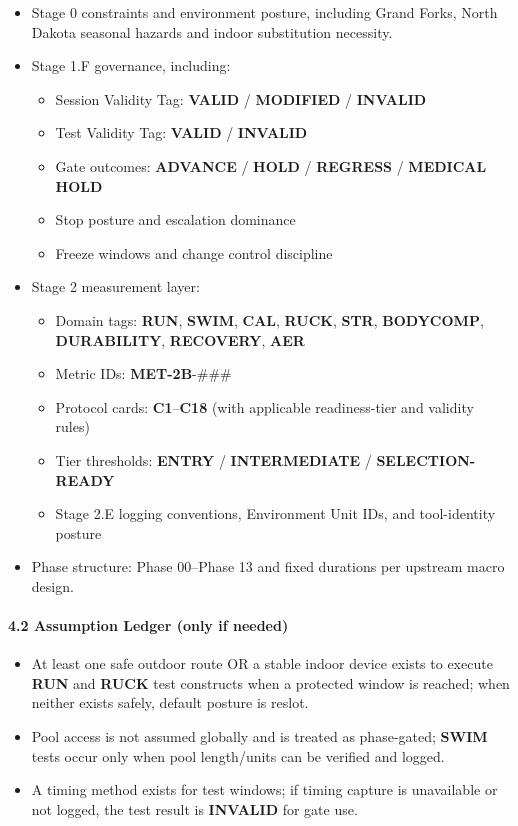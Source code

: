 \documentclass[10pt]{article}
\begin{document}
\begin{itemize}
\item Stage 0 constraints and environment posture, including Grand Forks, North Dakota seasonal hazards and indoor substitution necessity.
\item Stage 1.F governance, including:
  \begin{itemize}
  \item Session Validity Tag: \textbf{VALID} / \textbf{MODIFIED} / \textbf{INVALID}
  \item Test Validity Tag: \textbf{VALID} / \textbf{INVALID}
  \item Gate outcomes: \textbf{ADVANCE} / \textbf{HOLD} / \textbf{REGRESS} / \textbf{MEDICAL} \textbf{HOLD}
  \item Stop posture and escalation dominance
  \item Freeze windows and change control discipline
  \end{itemize}
\item Stage 2 measurement layer:
  \begin{itemize}
  \item Domain tags: \textbf{RUN}, \textbf{SWIM}, \textbf{CAL}, \textbf{RUCK}, \textbf{STR}, \textbf{BODYCOMP}, \textbf{DURABILITY}, \textbf{RECOVERY}, \textbf{AER}
  \item Metric IDs: \textbf{MET-2B}-###
  \item Protocol cards: \textbf{C1}–\textbf{C18} (with applicable readiness-tier and validity rules)
  \item Tier thresholds: \textbf{ENTRY} / \textbf{INTERMEDIATE} / \textbf{SELECTION-READY}
  \item Stage 2.E logging conventions, Environment Unit IDs, and tool-identity posture
  \end{itemize}
\item Phase structure: Phase 00–Phase 13 and fixed durations per upstream macro design.
\end{itemize}

\paragraph*{4.2 Assumption Ledger (only if needed)}

\begin{itemize}
\item At least one safe outdoor route OR a stable indoor device exists to execute \textbf{RUN} and \textbf{RUCK} test constructs when a protected window is reached; when neither exists safely, default posture is reslot.
\item Pool access is not assumed globally and is treated as phase-gated; \textbf{SWIM} tests occur only when pool length/units can be verified and logged.
\item A timing method exists for test windows; if timing capture is unavailable or not logged, the test result is \textbf{INVALID} for gate use.
\end{itemize}
\end{document}
